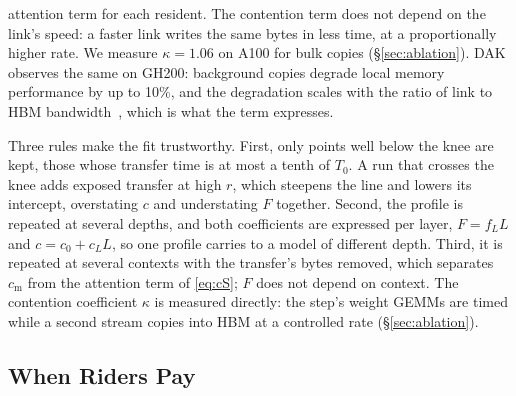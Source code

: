 attention term for each resident. The contention term does not depend on the
link's speed: a faster link writes the same bytes in less time, at a
proportionally higher rate. We measure $\kappa = 1.06$ on A100 for bulk copies
(\S\ref{sec:ablation}). DAK observes the same on GH200: background copies
degrade local memory performance by up to 10\%, and the degradation scales
with the ratio of link to HBM bandwidth~\cite{dak}, which is what the term
expresses.

Three rules make the fit trustworthy. First, only points well below the knee are
kept, those whose transfer time is at most a tenth of $T_0$. A run that crosses
the knee adds exposed transfer at high $r$, which steepens the line and lowers
its intercept, overstating $c$ and understating $F$ together. Second, the profile
is repeated at several depths, and both coefficients are expressed per layer,
$F = f_L L$ and $c = c_0 + c_L L$, so one profile carries to a model of
different depth. Third, it is repeated at several contexts with the
transfer's bytes removed, which separates $c_{\mathrm{m}}$ from the attention
term of \cref{eq:cS}; $F$ does not depend on context. The contention
coefficient $\kappa$ is measured directly: the
step's weight GEMMs are timed while a second stream copies into HBM at a
controlled rate (\S\ref{sec:ablation}).

\subsection{When Riders Pay}\label{sec:pays}

